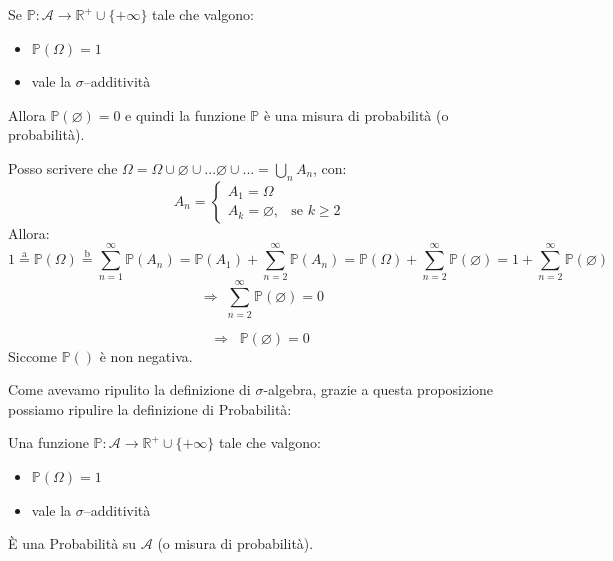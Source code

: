 \begin{proposizione}
    Se $\mathbb{P}:\mathcal{A}\rightarrow\mathbb{R}^+ \cup \{+\infty\}$ tale che valgono:
    \begin{itemize}
        \item [(a)] $\mathbb{P}(\Omega)=1$
        \item [(b)] vale la $\sigma$--additività
    \end{itemize}
    Allora $\mathbb{P}(\varnothing)=0$ e quindi la funzione $\mathbb{P}$ è una misura di probabilità (o probabilità).\\
    \begin{dimostrazione}
        Posso scrivere che $\Omega = \Omega \cup \varnothing\cup...\varnothing \cup... = \bigcup_n A_n$, con:
        \[
        A_n = 
    \begin{cases}
        A_1 = \Omega & \\
        A_k = \varnothing, & \text{se } k \geq 2
    \end{cases}
        \]
    Allora:
    \[
    1 \overset{\text{a}}{=} \mathbb{P}(\Omega)
    \overset{\text{b}}{=} \sum_{n=1}^{\infty} \mathbb{P}(A_n) 
    = \mathbb{P}(A_1) + \sum_{n=2}^{\infty} \mathbb{P}(A_n)
    = \mathbb{P}(\Omega) + \sum_{n=2}^{\infty} \mathbb{P}(\varnothing)
    = 1 + \sum_{n=2}^{\infty} \mathbb{P}(\varnothing)\]
\[\;\Rightarrow\;
\sum_{n=2}^{\infty} \mathbb{P}(\varnothing) = 0
\]

\[
\Rightarrow\;\; \mathbb{P}(\varnothing) = 0
\]
Siccome $\mathbb{P}()$ è non negativa.
    \end{dimostrazione}
\end{proposizione}
Come avevamo ripulito la definizione di $\sigma$-algebra, grazie a questa proposizione possiamo ripulire la definizione di Probabilità:
\begin{definizione}
    Una funzione $\mathbb{P}:\mathcal{A}\rightarrow\mathbb{R}^+ \cup \{+\infty\}$ tale che valgono:
    \begin{itemize}
        \item [(a)] $\mathbb{P}(\Omega)=1$
        \item [(b)] vale la $\sigma$--additività
    \end{itemize}
    È una Probabilità su $\mathcal{A}$ (o misura di probabilità).
\end{definizione}

